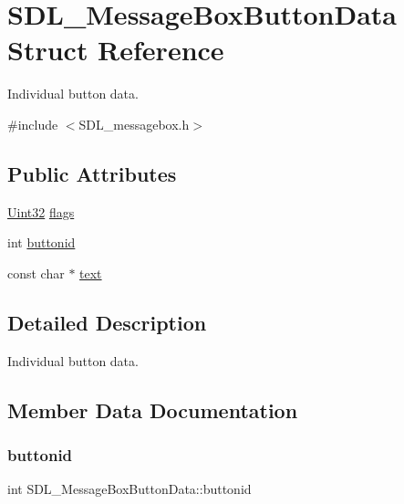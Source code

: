 \hypertarget{struct_s_d_l___message_box_button_data}{}\section{S\+D\+L\+\_\+\+Message\+Box\+Button\+Data Struct Reference}
\label{struct_s_d_l___message_box_button_data}


Individual button data.  




{\ttfamily \#include $<$S\+D\+L\+\_\+messagebox.\+h$>$}

\subsection*{Public Attributes}
\begin{DoxyCompactItemize}
\item 
\hyperlink{_s_d_l__stdinc_8h_add440eff171ea5f55cb00c4a9ab8672d}{Uint32} \hyperlink{struct_s_d_l___message_box_button_data_a426c8b5da0e718242c7840706d95de0b}{flags}
\item 
int \hyperlink{struct_s_d_l___message_box_button_data_a22938886a6b13792006cc5c91fa38e92}{buttonid}
\item 
const char $\ast$ \hyperlink{struct_s_d_l___message_box_button_data_af35f3062f0577159284c8828caaf08e4}{text}
\end{DoxyCompactItemize}


\subsection{Detailed Description}
Individual button data. 

\subsection{Member Data Documentation}
\mbox{\label{struct_s_d_l___message_box_button_data_a22938886a6b13792006cc5c91fa38e92}} 
\subsubsection{\texorpdfstring{buttonid}{buttonid}}
{\footnotesize\ttfamily int S\+D\+L\+\_\+\+Message\+Box\+Button\+Data\+::buttonid}

